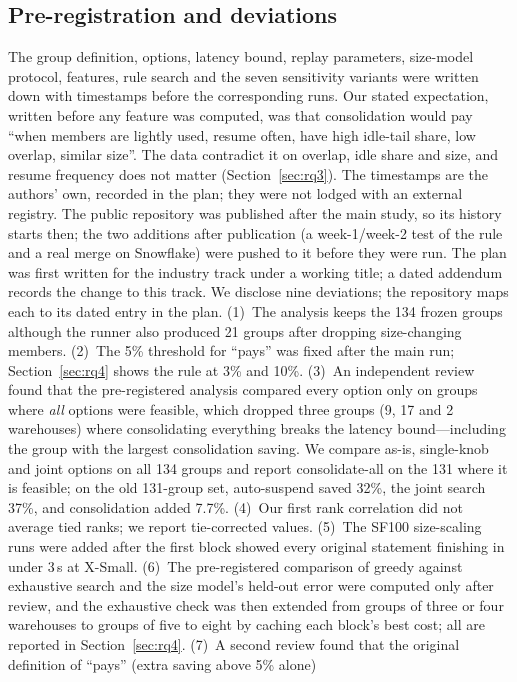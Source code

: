 \documentclass[conference]{IEEEtran}
\begin{document}
\subsection{Pre-registration and deviations}\label{sec:prereg}
The group definition, options, latency bound, replay parameters, size-model protocol, features, rule search and the seven
sensitivity variants were written down with timestamps before the corresponding runs. Our stated expectation, written
before any feature was computed, was that consolidation would pay ``when members are lightly used, resume often, have high
idle-tail share, low overlap, similar size''. The data contradict it on overlap, idle share and size, and resume frequency
does not matter (Section~\ref{sec:rq3}). The timestamps are the authors' own, recorded in the plan; they were not lodged with an
external registry. The public repository was published after the main study, so its history starts then; the two
additions after publication (a week-1/week-2 test of the rule and a real merge on Snowflake) were pushed to it before
they were run. The plan was first written for the industry track under a
working title; a dated addendum records the change to this track. We disclose nine deviations; the repository maps each to
its dated entry in the plan. (1)~The analysis keeps the 134 frozen groups although the runner also produced 21 groups after
dropping size-changing members. (2)~The 5\% threshold for ``pays'' was fixed after the main run; Section~\ref{sec:rq4} shows
the rule at 3\% and 10\%. (3)~An independent review found that the pre-registered analysis compared every option only on
groups where \emph{all} options were feasible, which dropped three groups (9, 17 and 2 warehouses) where consolidating
everything breaks the latency bound---including the group with the largest consolidation saving. We compare as-is,
single-knob and joint options on all 134 groups and report consolidate-all on the 131 where it is feasible; on the old
131-group set, auto-suspend saved 32\%, the joint search 37\%, and consolidation added 7.7\%. (4)~Our first rank correlation
did not average tied ranks; we report tie-corrected values. (5)~The SF100 size-scaling runs were added after the first
block showed every original statement finishing in under 3\,s at X-Small. (6)~The pre-registered comparison of greedy
against exhaustive search and the size model's held-out error were computed only after review, and the exhaustive check was then extended from groups of three or four warehouses to groups
of five to eight by caching each block's best cost; all are reported in Section~\ref{sec:rq4}. (7)~A second review found that the original definition of ``pays'' (extra saving above 5\% alone)
\end{document}
